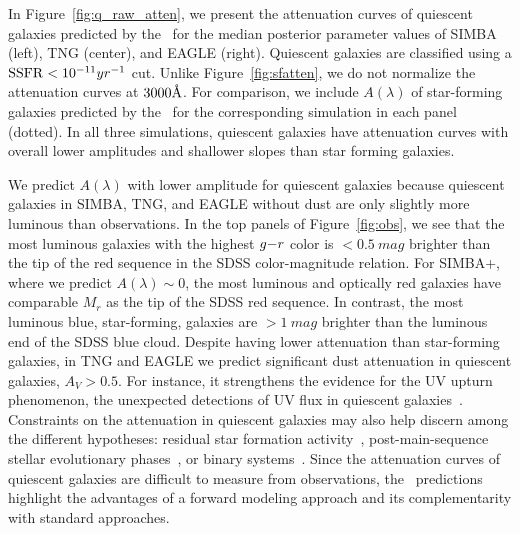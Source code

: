 In Figure~\ref{fig:q_raw_atten}, we present the attenuation curves of
quiescent galaxies predicted by the \eda~for the median posterior parameter
values of SIMBA (left), TNG (center), and EAGLE (right). 
Quiescent galaxies are classified using a ${\rm SSFR} < 10^{-11}{yr}^{-1}$ cut. 
Unlike Figure~\ref{fig:sfatten}, we do not normalize the attenuation curves at
$3000\AA$.  
For comparison, we include $A(\lambda)$ of star-forming galaxies predicted
by the \eda~for the corresponding simulation in each panel (dotted).
In all three simulations, quiescent galaxies have attenuation curves with
overall lower amplitudes and shallower slopes than star forming galaxies.

We predict $A(\lambda)$ with lower amplitude for quiescent galaxies because
quiescent galaxies in SIMBA, TNG, and EAGLE without dust are only slightly
more luminous than observations. 
In the top panels of Figure~\ref{fig:obs}, we see that the most luminous
galaxies with the highest $g{-}r$ color is $<0.5~mag$ brighter than the tip of
the red sequence in the SDSS color-magnitude relation. 
For SIMBA+\eda, where we predict $A(\lambda) \sim 0$, the most luminous and
optically red galaxies have comparable $M_r$ as the tip of the SDSS red sequence.
In contrast, the most luminous blue, star-forming, galaxies are $>1~mag$
brighter than the luminous end of the SDSS blue cloud.
Despite having lower attenuation than star-forming galaxies, in TNG and
EAGLE we predict significant dust attenuation in quiescent galaxies, $A_V > 0.5$.
For instance, it strengthens the evidence for the UV upturn phenomenon, the
unexpected detections of UV flux in quiescent galaxies~\citep[\eg][]{code1969,
oconnell1999, lecras2016, ali2018, dantas2021}. 
Constraints on the attenuation in quiescent galaxies may also help discern
among the different hypotheses: residual star formation
activity~\citep[\eg~][]{kaviraj2007}, post-main-sequence stellar evolutionary
phases~\citep[\eg~][]{yi1997}, or binary systems~\citep[\eg~][]{han2007}.
Since the attenuation curves of quiescent galaxies are difficult to measure
from observations, the \eda~predictions highlight the advantages of a
forward modeling approach and its complementarity with standard approaches. 

